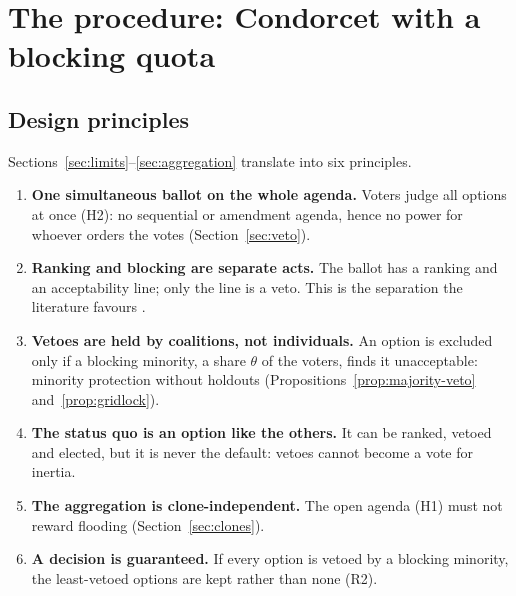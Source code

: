 \section{The procedure: Condorcet with a blocking quota}\label{sec:procedure}

\subsection{Design principles}

Sections~\ref{sec:limits}--\ref{sec:aggregation} translate into six principles.
\begin{enumerate}[label=P\arabic*]
  \item \textbf{One simultaneous ballot on the whole agenda.} Voters judge all options at once (H2): no
  sequential or amendment agenda, hence no power for whoever orders the votes (Section~\ref{sec:veto}).
  \item \textbf{Ranking and blocking are separate acts.} The ballot has a ranking and an acceptability
  line; only the line is a veto. This is the separation the literature favours
  \citep{BoutonLlorenteSaguerMalherbe2018}.
  \item \textbf{Vetoes are held by coalitions, not individuals.} An option is excluded only if a blocking
  minority, a share $\theta$ of the voters, finds it unacceptable: minority protection without holdouts
  (Propositions~\ref{prop:majority-veto} and~\ref{prop:gridlock}).
  \item \textbf{The status quo is an option like the others.} It can be ranked, vetoed and elected, but
  it is never the default: vetoes cannot become a vote for inertia.
  \item \textbf{The aggregation is clone-independent.} The open agenda (H1) must not reward flooding
  (Section~\ref{sec:clones}).
  \item \textbf{A decision is guaranteed.} If every option is vetoed by a blocking minority, the
  least-vetoed options are kept rather than none (R2).
\end{enumerate}

